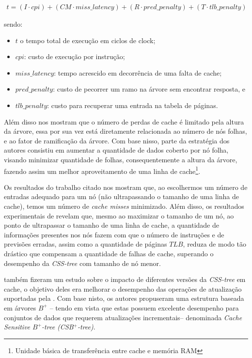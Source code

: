 \begin{eqnarray*}
    t = (I \cdot cpi) + (CM \cdot miss\_latency) + (R \cdot pred\_penalty) + (T \cdot tlb\_penalty) 
\end{eqnarray*}

sendo:

\begin{itemize}
    \item $t$ o tempo total de execução em ciclos de clock;
    \item $cpi$: custo de execução por instrução;
    \item $miss\_latency$:  tempo acrescido em decorrência de uma falta de cache;
    \item $pred\_penalty$: custo de pecorrer um ramo na árvore sem encontrar resposta, e
    \item $tlb\_penalty$: custo para recuperar uma entrada na  tabela de páginas.
\end{itemize}

Além disso \citet{paper-effect-node-size-cache-b-trees} nos mostram que o número de perdas de cache é limitado pela altura  da árvore,  essa por sua vez está diretamente relacionada ao número de nós folhas, e ao fator de ramificação da árvore. Com base nisso, parte da estratégia dos autores consistiu em aumentar a quantidade de dados coberto por nó folha, visando minimizar quantidade de folhas, consequentemente a altura da árvore, fazendo assim um melhor aproveitamento de uma linha de cache\footnote{Unidade básica de transferência entre cache e memória RAM}. 
 
Os resultados do trabalho citado nos mostram que, ao escolhermos um número de entradas adequado para um nó (não ultrapassando o tamanho de uma linha de cache), temos um número de \textit{cache misses} minimizado.  Além disso, os resultados experimentais de \citet{paper-effect-node-size-cache-b-trees}  revelam que, mesmo ao maximizar o tamanho de um nó, ao ponto de ultrapassar o tamanho de uma linha de cache, a quantidade de informações presentes nos nós fazem com que o número de instruções e de previsões erradas, assim como a quantidade de páginas $TLB$, reduza de modo tão drástico que compensam a quantidade de falhas de cache, superando o desempenho da \textit{CSS-tree} com tamanho de nó menor.

 \citet{paper-making-btree-cache} também fizeram um estudo sobre o impacto de diferentes versões da \textit{CSS-tree} em cache, o objetivo deles era melhorar o desempenho das operações de atualização suportadas pela . Com base nisto, os autores propuseram uma estrutura baseada em árvores $B^+$ -- tendo em vista que estas possuem excelente desempenho para conjuntos de dados que requerem atualizações incrementais-- denominada  \textit{Cache Sensitive $B^+$-tree (CSB$^+$-tree)}.

